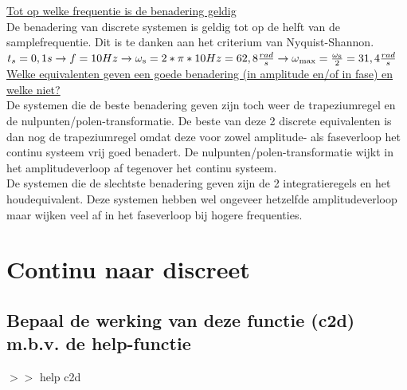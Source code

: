 \documentclass[a4paper, 12pt]{article}
\begin{document}
\underline{Tot op welke frequentie is de benadering geldig}\\
De benadering van discrete systemen is geldig tot op de helft van de samplefrequentie. Dit is te danken aan het criterium van Nyquist-Shannon. \\
$t_s = 0,1s \rightarrow f = 10Hz \rightarrow \omega\textsubscript{s} = 2 * \pi *10Hz = 62,8\frac{rad}{s} \rightarrow \omega\textsubscript{max} = \frac{\omega\textsubscript{s}}{2} = 31,4\frac{rad}{s}$ \\

\underline{Welke equivalenten geven een goede benadering (in amplitude en/of in fase) en welke niet?}\\
De systemen die de beste benadering geven zijn toch weer de trapeziumregel en de nulpunten/polen-transformatie. De beste van deze 2 discrete equivalenten is dan nog de trapeziumregel omdat deze voor zowel amplitude- als faseverloop het continu systeem vrij goed benadert. De nulpunten/polen-transformatie wijkt in het amplitudeverloop af tegenover het continu systeem. \\
De systemen die de slechtste benadering geven zijn de 2 integratieregels en het houdequivalent. Deze systemen hebben wel ongeveer hetzelfde amplitudeverloop maar wijken veel af in het faseverloop bij hogere frequenties.

\section{Continu naar discreet}

\subsection{Bepaal de werking van deze functie (c2d) m.b.v. de help-functie}

$>>$ help c2d
\end{document}

